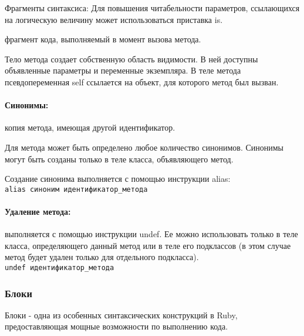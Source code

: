 \begin{keylist}{Фрагменты синтаксиса:}
  Для повышения читабельности параметров, ссылающихся на логическую величину может использоваться приставка is.

   фрагмент кода, выполняемый в момент вызова метода.

  Тело метода создает собственную область видимости. В ней доступны объявленные параметры и переменные экземпляра. В теле метода псевдопеременная self ссылается на объект, для которого метод был вызван.
  
\end{keylist}

\paragraph*{Синонимы:} копия метода, имеющая другой идентификатор.

Для метода может быть определено любое количество синонимов. Синонимы могут быть созданы только в теле класса, объявляющего метод.

Создание синонима выполняется с помощью инструкции alias:
\\\verb!alias синоним идентификатор_метода!

\paragraph*{Удаление метода:} выполняется с помощью инструкции undef. Ее можно использовать только в теле класса, определяющего данный метод или в теле его подклассов (в этом случае метод будет удален только для отдельного подкласса).
\\ \verb!undef идентификатор_метода!

\subsubsection*{Блоки}

Блоки - одна из особенных синтаксических конструкций в Ruby, предоставляющая мощные возможности по выполнению кода.


